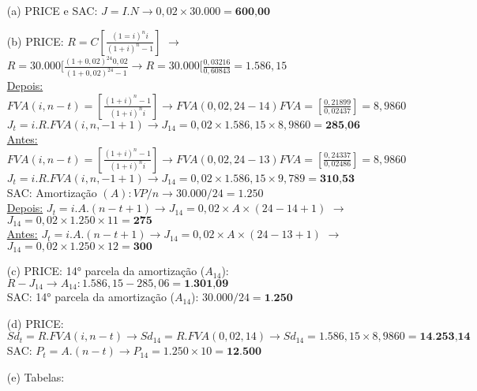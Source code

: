 \documentclass[report]{uftex}
\begin{document}
\begin{itemize}
	\item[(a)] PRICE e SAC:
	 $J = I . N \rightarrow 0,02 \times 30.000 = \textbf{600,00}$
	
	\item[(b)] PRICE:
	$R = C[\frac{(1=i)^ni}{(1+i)^n-1}]$ $\rightarrow$ $R = 30.000[\frac{(1+0,02)^{24}0,02}{(1+0,02)^{24}-1} \rightarrow R = 30.000[\frac{0,03216}{0,60843} = 1.586,15$ \\
	\underline{Depois:} $FVA(i,n-t) = [\frac{(1+i)^n-1}{(1+i)^ni}] \rightarrow FVA(0,02, 24-14) FVA = [\frac{0,21899}{0,02437}] = 8,9860$ \\
	 $J_{t} = i . R . FVA (i,n,-1+1) \rightarrow J_{14} = 0,02 \times 1.586,15 \times 8,9860 = \textbf{285,06}$\\
	\underline{Antes:}  $FVA(i,n-t) = [\frac{(1+i)^n-1}{(1+i)^ni}] \rightarrow FVA(0,02, 24-13) FVA = [\frac{0,24337}{0,02486}] = 8,9860$ \\
	$J_{t} = i . R . FVA (i,n,-1+1) \rightarrow J_{14} = 0,02 \times 1.586,15 \times 9,789 = \textbf{310,53}$\\
	
	SAC: 
	Amortização $(A): VP/n \rightarrow 30.000/24 = 1.250$ \\
	\underline{Depois:}
	$J_t = i.A.(n-t+1) \rightarrow J_{14} = 0,02 \times A \times (24-14+1)$ $\rightarrow$ $J_{14} = 0,02 \times 1.250 \times 11 = \textbf{275}$\\
	\underline{Antes:}
	$J_t = i.A.(n-t+1) \rightarrow J_{14} = 0,02 \times A \times (24-13+1)$ $\rightarrow$ $J_{14} = 0,02 \times 1.250 \times 12 = \textbf{300}$ \\

	\item[(c)] PRICE:
	14° parcela da amortização ($A_{14}$): $R - J_{14} \rightarrow A_{14}: 1.586,15 - 285,06 = \textbf{1.301,09}$\\
	SAC: 
	14° parcela da amortização ($A_{14}$): $30.000/24 = \textbf{1.250}$
	 
	\item[(d)] PRICE:
	$Sd_{t} = R.FVA(i,n-t) \rightarrow Sd_{14} = R.FVA(0,02,14) \rightarrow Sd_{14} = 1.586,15 \times 8,9860 = \textbf{14.253,14}$\\
	SAC: 
	$P_{t} = A.(n-t) \rightarrow P_{14} = 1.250 \times 10 = \textbf{12.500}$
	
	\item[(e)] Tabelas:
	

\end{itemize}
\end{document}
